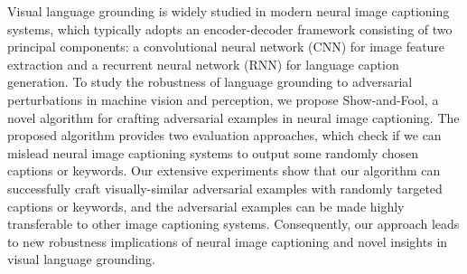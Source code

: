 Visual language grounding is widely studied in modern neural image captioning systems, which typically adopts an encoder-decoder framework consisting of two principal components: a convolutional neural network (CNN) for image feature extraction and a recurrent neural network (RNN) for language caption generation. To study the robustness of language grounding to adversarial perturbations in machine vision and perception, we propose Show-and-Fool, a novel algorithm for crafting adversarial examples in neural image captioning. The proposed algorithm provides two evaluation approaches, which check if we can mislead neural image captioning systems to output some randomly chosen captions or keywords. Our extensive experiments show that our algorithm can successfully craft visually-similar adversarial examples with randomly targeted captions or keywords, and the adversarial examples can be made highly transferable to other image captioning systems. Consequently, our approach leads to new robustness implications of neural image captioning and novel insights in visual language grounding.
